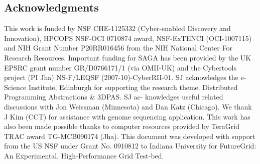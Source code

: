 \documentclass{acm_proc_article-sp}
\newcommand{\upp}{\vspace*{-0.5em}}
\begin{document}
\upp
\subsection*{Acknowledgments}
\scriptsize This work is funded by NSF CHE-1125332 (Cyber-enabled
Discovery and Innovation), HPCOPS NSF-OCI 0710874 award, NSF-ExTENCI
(OCI-1007115) and NIH Grant Number P20RR016456 from the NIH National
Center For Research Resources. Important funding for SAGA has been
provided by the UK EPSRC grant number GR/D0766171/1 (via OMII-UK) and
the Cybertools project (PI Jha) NS-F/LEQSF (2007-10)-CyberRII-01. SJ
acknowledges the e-Science Institute, Edinburgh for supporting the
research theme. Distributed Programming Abstractions \& 3DPAS. SJ ac-
knowledges useful related discussions with Jon Weissman (Minnesota)
and Dan Katz (Chicago). We thank J Kim (CCT) for assistance with
genome sequencing application. This work has also been made possible
thanks to computer resources provided by TeraGrid TRAC award
TG-MCB090174 (Jha). This document was developed with support from the
US NSF under Grant No. 0910812 to Indiana University for FutureGrid:
An Experimental, High-Performance Grid Test-bed.
\end{document}
